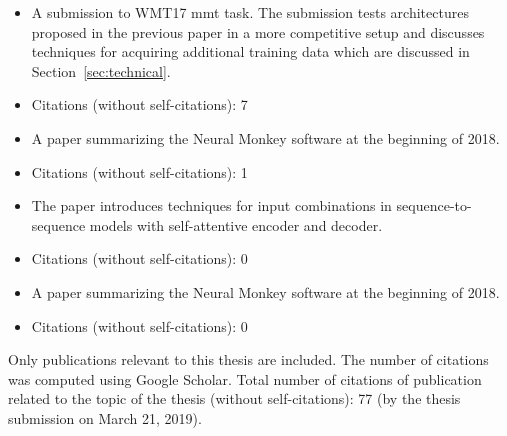
\newpage
\noindent{}
\begin{itemize}[noitemsep,topsep=0pt]

  \item A submission to WMT17 \gls{mmt} task. The submission tests
      architectures proposed in the previous paper in a more competitive setup
        and discusses techniques for acquiring additional training data which
        are discussed in Section~\ref{sec:technical}.

  \item Citations (without self-citations): 7

\end{itemize}\vspace{3mm}


\noindent{}
\begin{itemize}[noitemsep,topsep=0pt]

  \item A paper summarizing the Neural Monkey software at the beginning of
      2018.

  \item Citations (without self-citations): 1

\end{itemize}\vspace{3mm}


\noindent{}
\begin{itemize}[noitemsep,topsep=0pt]

  \item The paper introduces techniques for input combinations in
      sequence-to-sequence models with self-attentive encoder and decoder.

  \item Citations (without self-citations): 0

\end{itemize}\vspace{3mm}


\noindent{}
\begin{itemize}[noitemsep,topsep=0pt]

  \item A paper summarizing the Neural Monkey software at the beginning of
      2018.

  \item Citations (without self-citations): 0

\end{itemize}\vspace{3mm}

\vspace{1cm}

\noindent Only publications relevant to this thesis are included. The number of
citations was computed using Google Scholar. Total number of citations of
publication related to the topic of the thesis (without self-citations):
{\large 77} (by the thesis submission on March 21, 2019).
